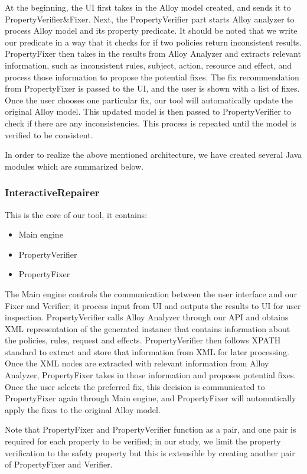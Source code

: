 \documentclass{acm_proc_article-sp}
\begin{document}
At the beginning, the UI first takes in the Alloy model created, and sends it to PropertyVerifier\&Fixer. Next, the PropertyVerifier part starts Alloy analyzer to process Alloy model and its property predicate. It should be noted that we write our predicate in a way that it checks for if two policies return inconsistent results. PropertyFixer then takes in the results from Alloy Analyzer and extracts relevant information, such as inconsistent rules, subject, action, resource and effect, and process those information to propose the potential fixes. The fix recommendation from PropertyFixer is passed to the UI, and the user is shown with a list of fixes. Once the user chooses one particular fix, our tool will automatically update the original Alloy model. This updated model is then passed to PropertyVerifier to check if there are any inconsistencies. This process is repeated until the model is verified to be consistent.

In order to realize the above mentioned architecture, we have created several Java modules which are summarized below.

\subsubsection{InteractiveRepairer}
This is the core of our tool, it contains:
\begin{itemize}
\item Main engine
\item PropertyVerifier
\item PropertyFixer
\end{itemize}
The Main engine controls the communication between the user interface and our Fixer and Verifier; it process input from UI and outputs the results to UI for user inspection. PropertyVerifier calls Alloy Analyzer through our API and obtains XML representation of the generated instance that contains information about the policies, rules, request and effects. PropertyVerifier then follows XPATH standard to extract and store that information from XML for later processing. Once the XML nodes are extracted with relevant information from Alloy Analyzer, PropertyFixer takes in those information and proposes potential fixes. Once the user selects the preferred fix, this decision is communicated to PropertyFixer again through Main engine, and PropertyFixer will automatically apply the fixes to the original Alloy model.

Note that PropertyFixer and PropertyVerifier function as a pair, and one pair is required for each property to be verified; in our study, we limit the property verification to the safety property but this is extensible by creating another pair of PropertyFixer and Verifier.
\end{document}
